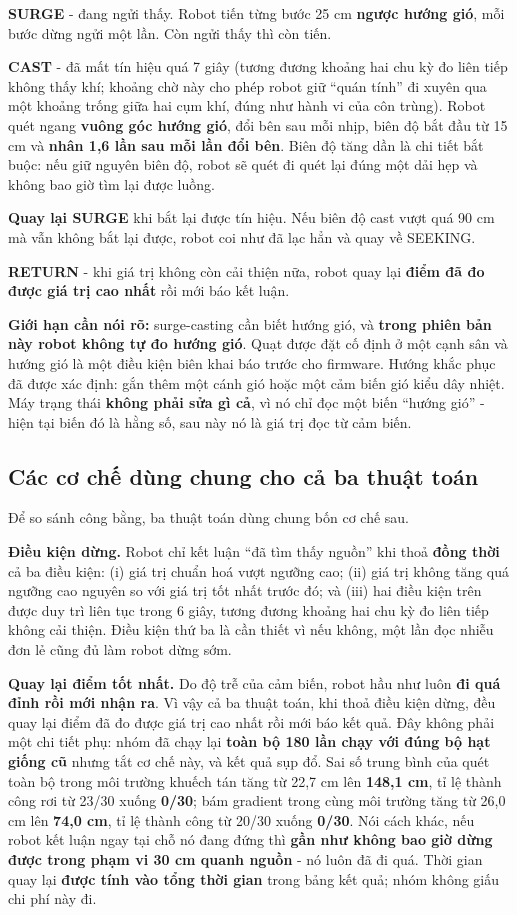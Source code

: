 \textbf{SURGE} - đang ngửi thấy. Robot tiến từng bước 25 cm \textbf{ngược hướng gió}, mỗi bước dừng ngửi một lần. Còn ngửi thấy thì còn tiến.

\textbf{CAST} - đã mất tín hiệu quá 7 giây (tương đương khoảng hai chu kỳ đo liên tiếp không thấy khí; khoảng chờ này cho phép robot giữ ``quán tính'' đi xuyên qua một khoảng trống giữa hai cụm khí, đúng như hành vi của côn trùng). Robot quét ngang \textbf{vuông góc hướng gió}, đổi bên sau mỗi nhịp, biên độ bắt đầu từ 15 cm và \textbf{nhân 1,6 lần sau mỗi lần đổi bên}. Biên độ tăng dần là chi tiết bắt buộc: nếu giữ nguyên biên độ, robot sẽ quét đi quét lại đúng một dải hẹp và không bao giờ tìm lại được luồng.

\textbf{Quay lại SURGE} khi bắt lại được tín hiệu. Nếu biên độ cast vượt quá 90 cm mà vẫn không bắt lại được, robot coi như đã lạc hẳn và quay về SEEKING.

\textbf{RETURN} - khi giá trị không còn cải thiện nữa, robot quay lại \textbf{điểm đã đo được giá trị cao nhất} rồi mới báo kết luận.

\textbf{Giới hạn cần nói rõ:} surge-casting cần biết hướng gió, và \textbf{trong phiên bản này robot không tự đo hướng gió}. Quạt được đặt cố định ở một cạnh sân và hướng gió là một điều kiện biên khai báo trước cho firmware. Hướng khắc phục đã được xác định: gắn thêm một cánh gió hoặc một cảm biến gió kiểu dây nhiệt. Máy trạng thái \textbf{không phải sửa gì cả}, vì nó chỉ đọc một biến ``hướng gió'' - hiện tại biến đó là hằng số, sau này nó là giá trị đọc từ cảm biến.


\subsection{Các cơ chế dùng chung cho cả ba thuật toán}
Để so sánh công bằng, ba thuật toán dùng chung bốn cơ chế sau.

\textbf{Điều kiện dừng.} Robot chỉ kết luận ``đã tìm thấy nguồn'' khi thoả \textbf{đồng thời} cả ba điều kiện: (i) giá trị chuẩn hoá vượt ngưỡng cao; (ii) giá trị không tăng quá ngưỡng cao nguyên so với giá trị tốt nhất trước đó; và (iii) hai điều kiện trên được duy trì liên tục trong 6 giây, tương đương khoảng hai chu kỳ đo liên tiếp không cải thiện. Điều kiện thứ ba là cần thiết vì nếu không, một lần đọc nhiễu đơn lẻ cũng đủ làm robot dừng sớm.

\textbf{Quay lại điểm tốt nhất.} Do độ trễ của cảm biến, robot hầu như luôn \textbf{đi quá đỉnh rồi mới nhận ra}. Vì vậy cả ba thuật toán, khi thoả điều kiện dừng, đều quay lại điểm đã đo được giá trị cao nhất rồi mới báo kết quả. Đây không phải một chi tiết phụ: nhóm đã chạy lại \textbf{toàn bộ 180 lần chạy với đúng bộ hạt giống cũ} nhưng tắt cơ chế này, và kết quả sụp đổ. Sai số trung bình của quét toàn bộ trong môi trường khuếch tán tăng từ 22,7 cm lên \textbf{148,1 cm}, tỉ lệ thành công rơi từ 23/30 xuống \textbf{0/30}; bám gradient trong cùng môi trường tăng từ 26,0 cm lên \textbf{74,0 cm}, tỉ lệ thành công từ 20/30 xuống \textbf{0/30}. Nói cách khác, nếu robot kết luận ngay tại chỗ nó đang đứng thì \textbf{gần như không bao giờ dừng được trong phạm vi 30 cm quanh nguồn} - nó luôn đã đi quá. Thời gian quay lại \textbf{được tính vào tổng thời gian} trong bảng kết quả; nhóm không giấu chi phí này đi.

